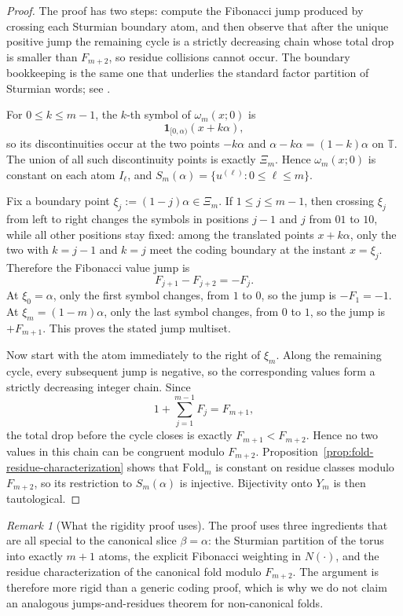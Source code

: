 \documentclass[11pt,letterpaper]{article}
\numberwithin{equation}{section}
\theoremstyle{plain}
\theoremstyle{definition}
\theoremstyle{remark}
\newtheorem{remark}[theorem]{Remark}
\newcommand{\TT}{\mathbb{T}}
\newcommand{\Fold}{\mathrm{Fold}}
\begin{document}
\begin{proof}
The proof has two steps: compute the Fibonacci jump produced by crossing each
Sturmian boundary atom, and then observe that after the unique positive jump
the remaining cycle is a strictly decreasing chain whose total drop is smaller
than \(F_{m+2}\), so residue collisions cannot occur. The boundary bookkeeping
is the same one that underlies the standard factor partition of Sturmian words;
see \cite{LindMarcus1995,Fogg2002,Berthe2001Ostrowski}.

For \(0\le k\le m-1\), the \(k\)-th symbol of \(\omega_m(x;0)\) is
\[
\mathbf{1}_{[0,\alpha)}(x+k\alpha),
\]
so its discontinuities occur at the two points \(-k\alpha\) and
\(\alpha-k\alpha=(1-k)\alpha\) on \(\TT\). The union of all such discontinuity
points is exactly \(\Xi_m\). Hence \(\omega_m(x;0)\) is constant on each atom
\(I_\ell\), and \(S_m(\alpha)=\{u^{(\ell)}:0\le \ell\le m\}\).

Fix a boundary point \(\xi_j:=(1-j)\alpha\in\Xi_m\).
If \(1\le j\le m-1\), then crossing \(\xi_j\) from left to right changes the
symbols in positions \(j-1\) and \(j\) from \(01\) to \(10\), while all other
positions stay fixed: among the translated points \(x+k\alpha\), only the two
with \(k=j-1\) and \(k=j\) meet the coding boundary at the instant \(x=\xi_j\).
Therefore the Fibonacci value jump is
\[
F_{j+1}-F_{j+2}=-F_j.
\]
At \(\xi_0=\alpha\), only the first symbol changes, from \(1\) to \(0\), so
the jump is \(-F_1=-1\). At \(\xi_m=(1-m)\alpha\), only the last symbol
changes, from \(0\) to \(1\), so the jump is \(+F_{m+1}\). This proves the
stated jump multiset.

Now start with the atom immediately to the right of \(\xi_m\). Along the
remaining cycle, every subsequent jump is negative, so the corresponding values
form a strictly decreasing integer chain. Since
\[
1+\sum_{j=1}^{m-1}F_j=F_{m+1},
\]
the total drop before the cycle closes is exactly \(F_{m+1}<F_{m+2}\). Hence
no two values in this chain can be congruent modulo \(F_{m+2}\).
Proposition~\ref{prop:fold-residue-characterization} shows that
\(\Fold_m\) is constant on residue classes modulo \(F_{m+2}\), so its
restriction to \(S_m(\alpha)\) is injective. Bijectivity onto \(Y_m\) is then
tautological.
\end{proof}

\begin{remark}[What the rigidity proof uses]
\label{rem:sturmian-rigidity-special}
The proof uses three ingredients that are all special to the canonical slice
\(\beta=\alpha\): the Sturmian partition of the torus into exactly \(m+1\)
atoms, the explicit Fibonacci weighting in \(N(\cdot)\), and the residue
characterization of the canonical fold modulo \(F_{m+2}\). The argument is
therefore more rigid than a generic coding proof, which is why we do not claim
an analogous jumps-and-residues theorem for non-canonical folds.
\end{remark}
\end{document}
